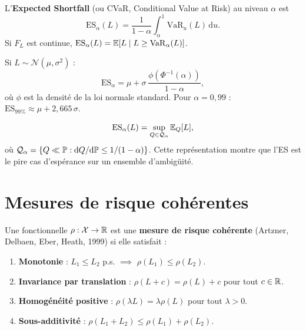\begin{definition}
L'\textbf{Expected Shortfall} (ou CVaR, Conditional Value at Risk) au niveau
$\alpha$ est
\[
    \mathrm{ES}_\alpha(L) = \frac{1}{1-\alpha}\int_\alpha^1
    \mathrm{VaR}_u(L)\,\mathrm{d}u.
\]
Si $F_L$ est continue, $\mathrm{ES}_\alpha(L) = \mathbb{E}[L \mid L \geq \mathrm{VaR}_\alpha(L)]$.
\end{definition}

\begin{exemple}[ES gaussien]
Si $L \sim \mathcal{N}(\mu, \sigma^2)$ :
\[
    \mathrm{ES}_\alpha = \mu + \sigma\,\frac{\phi(\Phi^{-1}(\alpha))}{1 - \alpha},
\]
o\`u $\phi$ est la densit\'e de la loi normale standard. Pour $\alpha = 0{,}99$ :
$\mathrm{ES}_{99\%} \approx \mu + 2{,}665\,\sigma$.
\end{exemple}

\begin{theoreme}
\[
    \mathrm{ES}_\alpha(L) = \sup_{Q \in \mathcal{Q}_\alpha} \mathbb{E}_Q[L],
\]
o\`u $\mathcal{Q}_\alpha = \{Q \ll \mathbb{P} : \mathrm{d}Q/\mathrm{d}\mathbb{P} \leq 1/(1-\alpha)\}$.
Cette repr\'esentation montre que l'ES est le pire cas d'esp\'erance sur un
ensemble d'ambig\"uit\'e.
\end{theoreme}

\section{Mesures de risque coh\'erentes}

\begin{definition}
Une fonctionnelle $\rho : \mathcal{X} \to \mathbb{R}$ est une \textbf{mesure de risque
coh\'erente} (Artzner, Delbaen, Eber, Heath, 1999) si elle satisfait :
\begin{enumerate}
    \item \textbf{Monotonie} : $L_1 \leq L_2$ p.s. $\implies$ $\rho(L_1) \leq \rho(L_2)$.
    \item \textbf{Invariance par translation} : $\rho(L + c) = \rho(L) + c$
    pour tout $c \in \mathbb{R}$.
    \item \textbf{Homog\'en\'eit\'e positive} : $\rho(\lambda L) = \lambda\rho(L)$
    pour tout $\lambda > 0$.
    \item \textbf{Sous-additivit\'e} : $\rho(L_1 + L_2) \leq \rho(L_1) + \rho(L_2)$.
\end{enumerate}
\end{definition}

